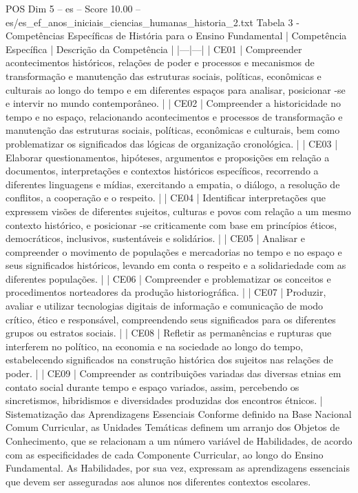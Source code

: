 \begin{textsample}{POS Dim 5 – es – Score 10.00 – es/es\_ef\_anos\_iniciais\_ciencias\_humanas\_historia\_2.txt}
Tabela 3 - Competências Específicas de História para o Ensino Fundamental | Competência Específica | Descrição da Competência | |---|---| | CE01 | Compreender acontecimentos históricos, relações de poder e processos e mecanismos de transformação e manutenção das estruturas sociais, políticas, econômicas e culturais ao longo do tempo e em diferentes espaços para analisar, posicionar -se e intervir no mundo contemporâneo. | | CE02 | Compreender a historicidade no tempo e no espaço, relacionando acontecimentos e processos de transformação e manutenção das estruturas sociais, políticas, econômicas e culturais, bem como problematizar os significados das lógicas de organização cronológica. | | CE03 | Elaborar questionamentos, hipóteses, argumentos e proposições em relação a documentos, interpretações e contextos históricos específicos, recorrendo a diferentes linguagens e mídias, exercitando a empatia, o diálogo, a resolução de conflitos, a cooperação e o respeito. | | CE04 | Identificar interpretações que expressem visões de diferentes sujeitos, culturas e povos com relação a um mesmo contexto histórico, e posicionar -se criticamente com base em princípios éticos, democráticos, inclusivos, sustentáveis e solidários. | | CE05 | Analisar e compreender o movimento de populações e mercadorias no tempo e no espaço e seus significados históricos, levando em conta o respeito e a solidariedade com as diferentes populações. | | CE06 | Compreender e problematizar os conceitos e procedimentos norteadores da produção historiográfica. | | CE07 | Produzir, avaliar e utilizar tecnologias digitais de informação e comunicação de modo crítico, ético e responsável, compreendendo seus significados para os diferentes grupos ou estratos sociais. | | CE08 | Refletir as permanências e rupturas que interferem no político, na economia e na sociedade ao longo do tempo, estabelecendo significados na construção histórica dos sujeitos nas relações de poder. | | CE09 | Compreender as contribuições variadas das diversas etnias em contato social durante tempo e espaço variados, assim, percebendo os sincretismos, hibridismos e diversidades produzidas dos encontros étnicos. | Sistematização das Aprendizagens Essenciais Conforme definido na Base Nacional Comum Curricular, as Unidades Temáticas definem um arranjo dos Objetos de Conhecimento, que se relacionam a um número variável de Habilidades, de acordo com as especificidades de cada Componente Curricular, ao longo do Ensino Fundamental.
As Habilidades, por sua vez, expressam as aprendizagens essenciais que devem ser asseguradas aos alunos nos diferentes contextos escolares.

\end{textsample}
